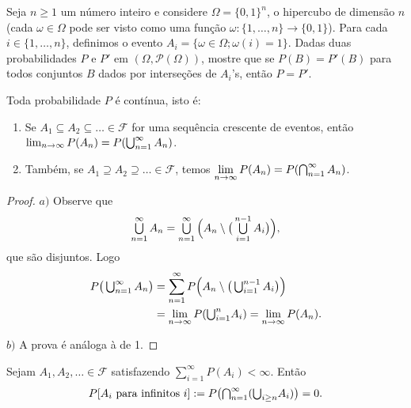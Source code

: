 \documentclass[../main/Notas_de_aula.tex]{subfiles}
\begin{document}
\begin{exercise}
  Seja $n \geq 1$ um número inteiro e considere $\Omega = \{0, 1\}^n$, o hipercubo de dimensão $n$ (cada $\omega \in \Omega$ pode ser visto como uma função $\omega:\{1, \dots, n\} \to \{0,1\}$).
  Para cada $i \in \{1, \dots, n\}$, definimos o evento $A_i = \{ \omega \in \Omega; \omega(i) = 1 \}$.
  Dadas duas probabilidades $P$ e $P'$ em $(\Omega, \mathcal{P}(\Omega))$, mostre que se $P(B) = P'(B)$ para todos conjuntos $B$ dados por interseções de $A_i$'s, então $P = P'$.
\end{exercise}

\begin{proposition}
  \label{p:prob_continua}
  Toda probabilidade $P$ é contínua, isto é:
  \begin{enumerate}[\quad a)]
  \item Se $A_1 \subseteq A_2 \subseteq \dots \in \mathcal{F}$ for uma sequência crescente de eventos, então \\
  $\lim_{n\to \infty} P(A_n) = P(\operatorname*{{\textstyle \bigcup}}\nolimits_{n=1}^{\infty} A_n)$.
  \item Também, se $A_1 \supseteq A_2 \supseteq \dots \in \mathcal{F}$, temos $\lim\limits _{n\to \infty} P(A_n) = P(\operatorname*{{\textstyle \bigcap}}\nolimits_{n=1}^{\infty} A_n)$.
  \end{enumerate}
\end{proposition}

\begin{proof}
  $a)$ Observe que
  \begin{equation}
    \operatorname*{{\textstyle \bigcup}}_{n = 1}^\infty A_n = \operatorname*{{\textstyle \bigcup}}_{n = 1}^\infty \Big( A_n \setminus \big( \operatorname*{{\textstyle \bigcup}}_{i=1}^{n-1} A_i \big) \Big),
  \end{equation}
  que são disjuntos.
  Logo
  \begin{equation}
    \begin{split}
      P\big(\operatorname*{{\textstyle \bigcup}}\nolimits_{n = 1}^\infty A_n\big) & = \sum_{n = 1}^\infty P\Big( A_n \setminus \big(\operatorname*{{\textstyle \bigcup}}\nolimits_{i=1}^{n-1} A_i \big) \Big)\\
      & = \lim_{n\to \infty} P({\operatorname*{{\textstyle \bigcup}}\nolimits_{i = 1}^n} A_i) = \lim_{n\to \infty} P(A_n).
    \end{split}
  \end{equation}

  $b)$ A prova é análoga à de 1.
\end{proof}

\begin{lemma}
  Sejam $A_1, A_2, \dots \in \mathcal{F}$ satisfazendo $\sum_{i = 1}^\infty P(A_i) < \infty$.
  Então
  \begin{equation}
    P[\text{$A_i$ para infinitos $i$}] := P\big({\operatorname*{{\textstyle \bigcap}}\nolimits_{n = 1}^\infty} ({\operatorname*{{\textstyle \bigcup}}\nolimits_{i \geq n}} A_i)\big) = 0.
  \end{equation}
\end{lemma}
\end{document}
